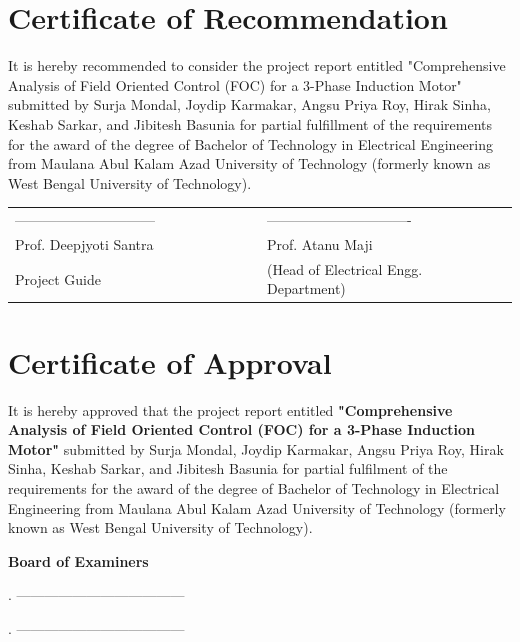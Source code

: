 \documentclass[12pt,a4paper]{report}
\begin{document}
\chapter*{Certificate of Recommendation}
It is hereby recommended to consider the project report entitled "Comprehensive Analysis of Field Oriented Control (FOC) for a 3-Phase Induction Motor" submitted by Surja Mondal, Joydip Karmakar, Angsu Priya Roy, Hirak Sinha, Keshab Sarkar, and Jibitesh Basunia for partial fulfillment of the requirements for the award of the degree of Bachelor of Technology in Electrical Engineering from Maulana Abul Kalam Azad University of Technology (formerly known as West Bengal University of Technology).

\vspace{3cm}
\noindent
\begin{tabular}{@{}p{0.5\linewidth}p{0.5\linewidth}@{}}
------------------------------ & ------------------------------- \\
Prof. Deepjyoti Santra & Prof. Atanu Maji  \\
Project Guide & (Head of Electrical Engg. Department)
\end{tabular}

\chapter*{Certificate of Approval}
It is hereby approved that the project report entitled \textbf{"Comprehensive Analysis of Field Oriented Control (FOC) for a 3-Phase Induction Motor"} submitted by Surja Mondal, Joydip Karmakar, Angsu Priya Roy, Hirak Sinha, Keshab Sarkar, and Jibitesh Basunia for partial fulfilment of the requirements for the award of the degree of Bachelor of Technology in Electrical Engineering from Maulana Abul Kalam Azad University of Technology (formerly known as West Bengal University of Technology).

\vspace{1.5cm}
\noindent\textbf{Board of Examiners}

\vspace{1.5cm}
. ------------------------------------

\vspace{1cm}
. ------------------------------------

\end{document}
